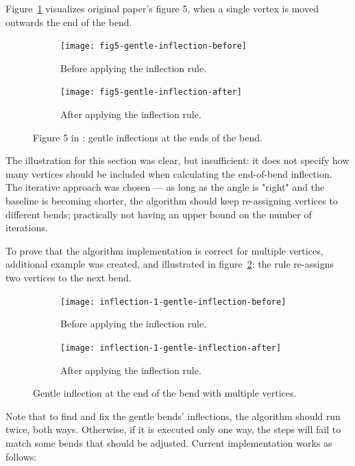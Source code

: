 \documentclass[a4paper]{article}
\begin{document}
Figure~\ref{fig:fig5-gentle-inflection} visualizes original paper's figure 5,
when a single vertex is moved outwards the end of the bend.

\begin{figure}[ht]
    \centering
    \begin{subfigure}[b]{.49\textwidth}
        \texttt{[image: fig5-gentle-inflection-before]}
        \caption{Before applying the inflection rule.}
    \end{subfigure}
    \hfill
    \begin{subfigure}[b]{.49\textwidth}
        \texttt{[image: fig5-gentle-inflection-after]}
        \caption{After applying the inflection rule.}
    \end{subfigure}
    \caption{Figure 5 in \cite{wang1998line}: gentle inflections at the ends of
    the bend.}
    \label{fig:fig5-gentle-inflection}
\end{figure}

The illustration for this section was clear, but insufficient: it does not
specify how many vertices should be included when calculating the end-of-bend
inflection. The iterative approach was chosen --- as long as the angle is
"right" and the baseline is becoming shorter, the algorithm should keep
re-assigning vertices to different bends; practically not having an upper bound
on the number of iterations.

To prove that the algorithm implementation is correct for multiple vertices,
additional example was created, and illustrated in
figure~\ref{fig:inflection-1-gentle-inflection}: the rule re-assigns two
vertices to the next bend.

\begin{figure}[ht]
    \centering
    \begin{subfigure}[b]{.49\textwidth}
        \texttt{[image: inflection-1-gentle-inflection-before]}
        \caption{Before applying the inflection rule.}
    \end{subfigure}
    \hfill
    \begin{subfigure}[b]{.49\textwidth}
        \texttt{[image: inflection-1-gentle-inflection-after]}
        \caption{After applying the inflection rule.}
    \end{subfigure}
    \caption{Gentle inflection at the end of the bend with multiple vertices.}
    \label{fig:inflection-1-gentle-inflection}
\end{figure}

Note that to find and fix the gentle bends' inflections, the algorithm should
run twice, both ways. Otherwise, if it is executed only one way, the steps will
fail to match some bends that should be adjusted. Current implementation works
as follows:
\end{document}
